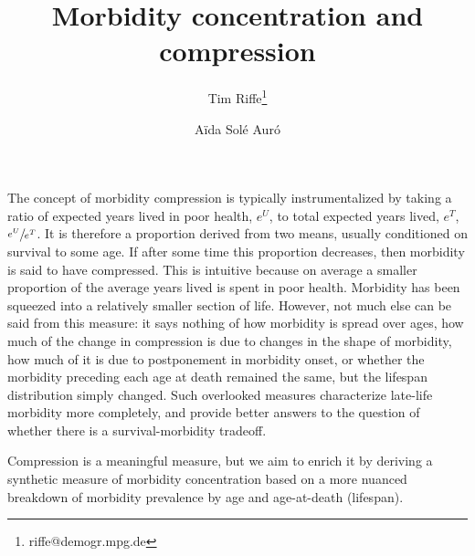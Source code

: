 \documentclass{article}
\begin{document}
\title{Morbidity concentration and compression}

\author[1]{Tim Riffe\thanks{riffe@demogr.mpg.de}}
\author[2]{A{\"i}da Sol\'{e} Aur\'{o}}

\maketitle

The concept of morbidity compression is typically instrumentalized by taking a
ratio of expected years lived in poor health, $e^U$, to total expected years lived,
$e^T$, $\sfrac{e^U}{e^T}$. It is therefore a proportion derived from two means,
usually conditioned on survival to some age. If after some time this proportion
decreases, then morbidity is said to have compressed. This is intuitive because on average a smaller proportion of the average years lived is spent in poor
health. Morbidity has been squeezed into a relatively smaller section of
life. However, not much else can be said from this measure:
it says nothing of how morbidity is spread over ages, how much of the change in compression is
due to changes in the shape of morbidity, how much of it is due to postponement in
morbidity onset, or whether the morbidity preceding each age at death remained
the same, but the lifespan distribution simply changed. Such overlooked measures
characterize late-life morbidity more completely, and provide better answers to
the question of whether there is a survival-morbidity tradeoff. 

Compression is a meaningful measure, but we aim to enrich it by deriving a
synthetic measure of morbidity concentration based on a more nuanced breakdown
of morbidity prevalence by age and age-at-death (lifespan). 
\end{document}
